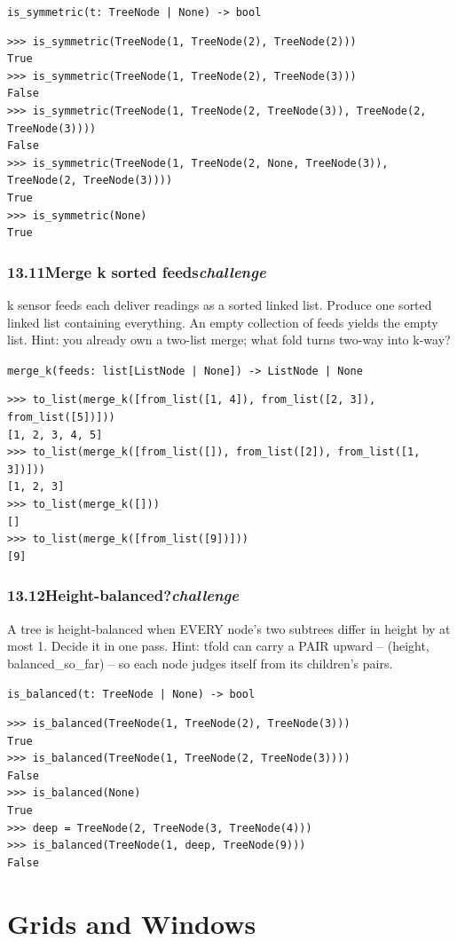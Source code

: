 \documentclass[10pt,letterpaper]{book}
\begin{document}
\noindent\texttt{is\_symmetric(t: TreeNode | None) -> bool}
\begin{lstlisting}[style=ex]
>>> is_symmetric(TreeNode(1, TreeNode(2), TreeNode(2)))
True
>>> is_symmetric(TreeNode(1, TreeNode(2), TreeNode(3)))
False
>>> is_symmetric(TreeNode(1, TreeNode(2, TreeNode(3)), TreeNode(2, TreeNode(3))))
False
>>> is_symmetric(TreeNode(1, TreeNode(2, None, TreeNode(3)), TreeNode(2, TreeNode(3))))
True
>>> is_symmetric(None)
True
\end{lstlisting}
\subsection*{13.11\quad Merge k sorted feeds\hfill\textnormal{\textit{challenge}}}
k sensor feeds each deliver readings as a sorted linked list. Produce one sorted linked list containing everything. An empty collection of feeds yields the empty list. Hint: you already own a two-list merge; what fold turns two-way into k-way?

\noindent\texttt{merge\_k(feeds: list[ListNode | None]) -> ListNode | None}
\begin{lstlisting}[style=ex]
>>> to_list(merge_k([from_list([1, 4]), from_list([2, 3]), from_list([5])]))
[1, 2, 3, 4, 5]
>>> to_list(merge_k([from_list([]), from_list([2]), from_list([1, 3])]))
[1, 2, 3]
>>> to_list(merge_k([]))
[]
>>> to_list(merge_k([from_list([9])]))
[9]
\end{lstlisting}
\subsection*{13.12\quad Height-balanced?\hfill\textnormal{\textit{challenge}}}
A tree is height-balanced when EVERY node's two subtrees differ in height by at most 1. Decide it in one pass. Hint: tfold can carry a PAIR upward -- (height, balanced\_so\_far) -- so each node judges itself from its children's pairs.

\noindent\texttt{is\_balanced(t: TreeNode | None) -> bool}
\begin{lstlisting}[style=ex]
>>> is_balanced(TreeNode(1, TreeNode(2), TreeNode(3)))
True
>>> is_balanced(TreeNode(1, TreeNode(2, TreeNode(3))))
False
>>> is_balanced(None)
True
>>> deep = TreeNode(2, TreeNode(3, TreeNode(4)))
>>> is_balanced(TreeNode(1, deep, TreeNode(9)))
False
\end{lstlisting}
\clearpage
\chapter{Grids and Windows}
\end{document}
